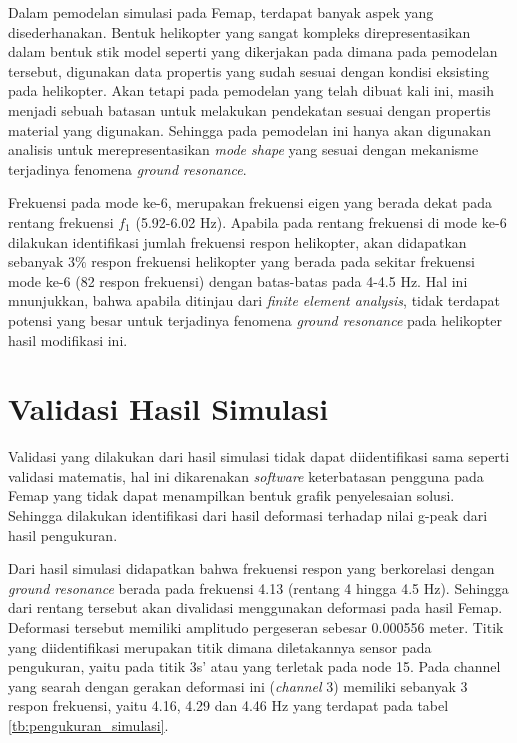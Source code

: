 Dalam pemodelan simulasi pada Femap, terdapat banyak aspek yang disederhanakan. Bentuk helikopter yang sangat kompleks direpresentasikan dalam bentuk stik model seperti yang dikerjakan pada \cite{Grzegorz2016THESP} dimana pada pemodelan tersebut, digunakan data propertis yang sudah sesuai dengan kondisi eksisting pada helikopter. Akan tetapi pada pemodelan yang telah dibuat kali ini, masih menjadi sebuah batasan untuk melakukan pendekatan sesuai dengan propertis material yang digunakan. Sehingga pada pemodelan ini hanya akan digunakan analisis untuk merepresentasikan \textit{mode shape} yang sesuai dengan mekanisme terjadinya fenomena \textit{ground resonance}.

Frekuensi pada mode ke-6, merupakan frekuensi eigen yang berada dekat pada rentang frekuensi $f_1$ (5.92-6.02 Hz). Apabila pada rentang frekuensi di mode ke-6 dilakukan identifikasi jumlah frekuensi respon helikopter, akan didapatkan sebanyak $3\%$ respon frekuensi helikopter yang berada pada sekitar frekuensi mode ke-6 (82 respon frekuensi) dengan batas-batas pada 4-4.5 Hz. Hal ini mnunjukkan, bahwa apabila ditinjau dari \textit{finite element analysis}, tidak terdapat potensi yang besar untuk terjadinya fenomena \textit{ground resonance} pada helikopter hasil modifikasi ini. 

\section{Validasi Hasil Simulasi}

Validasi yang dilakukan dari hasil simulasi tidak dapat diidentifikasi sama seperti validasi matematis, hal ini dikarenakan \textit{software} keterbatasan pengguna pada Femap yang tidak dapat menampilkan bentuk grafik penyelesaian solusi. Sehingga dilakukan identifikasi dari hasil deformasi terhadap nilai g-peak dari hasil pengukuran.

Dari hasil simulasi didapatkan bahwa frekuensi respon yang berkorelasi dengan \textit{ground resonance} berada pada frekuensi 4.13 (rentang 4 hingga 4.5 Hz). Sehingga dari rentang tersebut akan divalidasi menggunakan deformasi pada hasil Femap. Deformasi tersebut memiliki amplitudo pergeseran sebesar 0.000556 meter. Titik yang diidentifikasi merupakan titik dimana diletakannya sensor pada pengukuran, yaitu pada titik 3s' atau yang terletak pada node 15. Pada channel yang searah dengan gerakan deformasi ini (\textit{channel} 3) memiliki sebanyak 3 respon frekuensi, yaitu 4.16, 4.29 dan 4.46 Hz yang terdapat pada tabel \ref{tb:pengukuran_simulasi}.


